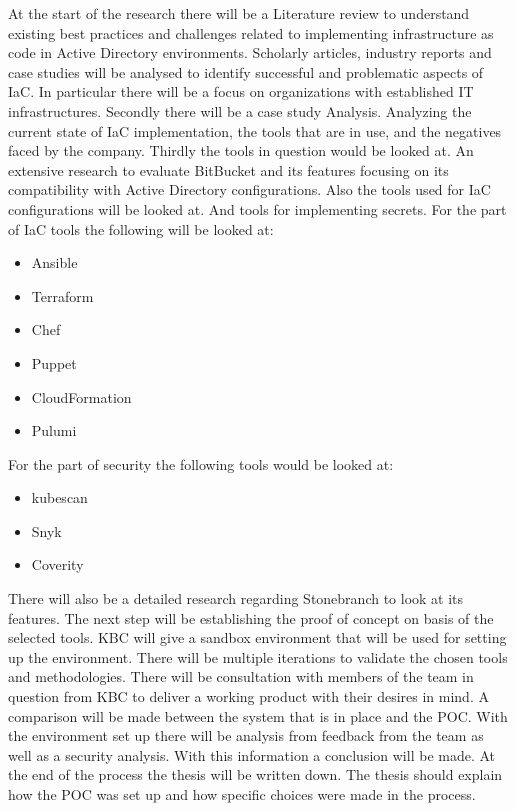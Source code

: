 At the start of the research there will be a Literature review to understand existing best practices and challenges related to implementing infrastructure as code in Active Directory environments. Scholarly articles, industry reports and case studies will be analysed to identify successful and problematic aspects of IaC. In particular there will be a focus on organizations with established IT infrastructures.
Secondly there will be a case study Analysis. Analyzing the current state of IaC implementation, the tools that are in use, and the negatives faced by the company.
Thirdly the tools in question would be looked at. An extensive research to evaluate BitBucket and its features focusing on its compatibility with Active Directory configurations. Also the tools used for IaC configurations will be looked at. And tools for implementing secrets. For the part of IaC tools the following will be looked at:
\begin{itemize}
  \item Ansible
  \item Terraform
  \item Chef
  \item Puppet
  \item CloudFormation
  \item Pulumi
\end{itemize}
For the part of security the following tools would be looked at:
\begin{itemize}
  \item kubescan
  \item Snyk
  \item Coverity
\end{itemize}
There will also be a detailed research regarding Stonebranch to look at its features.
The next step will be establishing the proof of concept on basis of the selected tools. KBC will give a sandbox environment that will be used for setting up the environment. There will be multiple iterations to validate the chosen tools and methodologies. There will be consultation with members of the team in question from KBC to deliver a working product with their desires in mind. A comparison will be made between the system that is in place and the POC. 
With the environment set up there will be analysis from feedback from the team as well as a security analysis. With this information a conclusion will be made.
At the end of the process the thesis will be written down. The thesis should explain how the POC was set up and how specific choices were made in the process.


